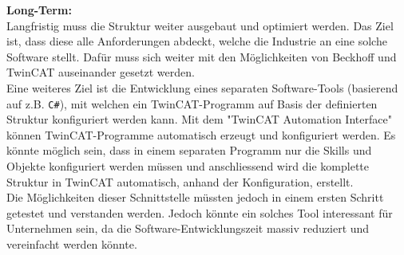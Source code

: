 	\textbf{Long-Term:}
	\vspace{2mm}  
	\\
	Langfristig muss die Struktur weiter ausgebaut und optimiert werden. Das Ziel ist, dass diese alle Anforderungen abdeckt, welche die Industrie an eine solche Software stellt. Dafür muss sich weiter mit den Möglichkeiten von Beckhoff und TwinCAT auseinander gesetzt werden. 
	\\
	Eine weiteres Ziel ist die Entwicklung eines separaten Software-Tools (basierend auf z.B. \verb|C#|), mit welchen ein TwinCAT-Programm auf Basis der definierten Struktur konfiguriert werden kann. Mit dem "TwinCAT Automation Interface" können TwinCAT-Programme automatisch erzeugt und konfiguriert werden. Es könnte möglich sein, dass in einem separaten Programm nur  die Skills und Objekte konfiguriert werden müssen und anschliessend wird die komplette Struktur in TwinCAT automatisch, anhand der Konfiguration, erstellt.
	\\
	Die Möglichkeiten dieser Schnittstelle müssten jedoch in einem ersten Schritt getestet und verstanden werden. Jedoch könnte ein solches Tool interessant für Unternehmen sein, da die Software-Entwicklungszeit massiv reduziert und vereinfacht werden könnte.